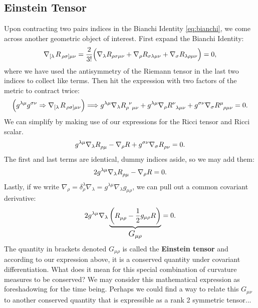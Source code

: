 \documentclass[10pt]{article}
\begin{document}
    \subsection{Einstein Tensor}
    Upon contracting two pairs indices in the Bianchi Identity \eqref{eq:bianchi}, we come across another geometric object of interest. First expand the Bianchi Identity:
    \begin{align}
    	\nabla_{\left[\lambda\right.}R_{\left.\rho\sigma\right]\mu\nu} = \frac{2}{3!}\Big( \nabla_{\lambda}R_{\rho\sigma\mu\nu} + \nabla_{\rho}R_{\sigma\lambda\mu\nu} + \nabla_{\sigma}R_{\lambda\rho\mu\nu} \Big) = 0, \notag
    \end{align}
    where we have used the antisymmetry of the Riemann tensor in the last two indices to collect like terms. Then hit the expression with two factors of the metric to contract twice:
    \begin{align}
    	\Big( g^{\lambda\mu}g^{\sigma\nu} \Rightarrow \nabla_{\left[\lambda\right.}R_{\left.\rho\sigma\right]\mu\nu} \Big) \Longrightarrow g^{\lambda\mu} \nabla_{\lambda}\tensor{R}{_\rho^\nu_\mu_\nu} + g^{\lambda\mu} \nabla_{\rho}\tensor{R}{^\nu_\lambda_\mu_\nu} + g^{\sigma\nu}\nabla_{\sigma}\tensor{R}{^\mu_\rho_\mu_\nu} = 0 . \notag
    \end{align}
    We can simplify by making use of our expressions for the Ricci tensor and Ricci scalar.
   	\begin{align}
    	 g^{\lambda\mu} \nabla_{\lambda}\tensor{R}{_\rho_\mu} - \nabla_{\rho}R + g^{\sigma\nu}\nabla_{\sigma}\tensor{R}{_\rho_\nu} = 0 . \notag
    \end{align}
    The first and last terms are identical, dummy indices aside, so we may add them:
   	\begin{align}
    	2 g^{\lambda\mu} \nabla_{\lambda}\tensor{R}{_\rho_\mu} - \nabla_{\rho}R  = 0 . \notag
    \end{align}
    Lastly, if we write $\nabla_{\rho}=\delta^{\lambda}_{\rho}\nabla_{\lambda}=g^{\lambda\mu}\nabla_{\lambda}g_{\mu\rho}$, we can pull out a common covariant derivative:
    \begin{align}
    	 2g^{\lambda\mu} \nabla_{\lambda} \underbrace{\left( \tensor{R}{_\mu_\rho} - \frac{1}{2}g_{\mu\rho}R \right)}_\text{\large $G_{\mu\rho}$}  = 0 . \notag
    \end{align}
    The quantity in brackets denoted $G_{\mu\rho}$ is called the \textbf{Einstein tensor} and according to our expression above, it is a conserved quantity under covariant differentiation. What does it mean for this special combination of curvature measures to be conserved? We may consider this mathematical expression as foreshadowing for the time being. Perhaps we could find a way to relate this $G_{\mu\nu}$ to another conserved quantity that is expressible as a rank 2 symmetric tensor...
\end{document}
